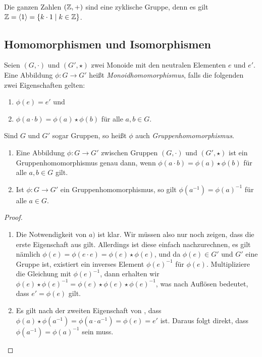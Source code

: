 {\begin{example}
  Die ganzen Zahlen $(\mathbb{Z},+)$ sind eine zyklische Gruppe, denn es gilt $\ZZ = \ip{1} = \left\{k \cdot 1 \suchthat k \in \ZZ \right\}$.
\end{example}

\subsection{Homomorphismen und Isomorphismen}

\begin{definition}[Homomorphismus]\label{def:algebra:homomorphismus}
  Seien $(G,\cdot)$ und $(G',\star)$ zwei Monoide mit den neutralen Elementen $e$ und $e'$. Eine Abbildung $\phi \colon G \rightarrow G'$ heißt \emph{Monoidhomomorphismus}, falls die folgenden zwei Eigenschaften gelten:
  \begin{enumerate}
    \item $\phi(e) = e'$ und
    \item $\phi(a \cdot b) = \phi(a) \star \phi(b)$ für alle $a,b \in G$.
  \end{enumerate}
  Sind $G$ und $G'$ sogar Gruppen, so heißt $\phi$ auch \emph{Gruppenhomomorphismus}.
\end{definition}

\begin{lemma}
  \leavevmode \vspace{-\baselineskip}
  \begin{enumerate}[label=\alph*)]
    \item Eine Abbildung $\phi \colon G \rightarrow G'$ zwischen Gruppen $(G,\cdot)$ und $(G',\star)$ ist ein Gruppenhomomorphismus genau dann, wenn $\phi(a \cdot b) = \phi(a) \star \phi(b)$ für alle $a,b \in G$ gilt.
    \item Ist $\phi \colon G \rightarrow G'$ ein Gruppenhomomorphismus, so gilt $\phi(a^{-1})=\phi(a)^{-1}$ für alle $a \in G$.
  \end{enumerate}
\end{lemma}

\begin{proof}
  \begin{enumerate}[label=\alph*)]
    \item Die Notwendigkeit von $a)$ ist klar. Wir müssen also nur noch zeigen, dass die erste Eigenschaft aus  gilt. Allerdings ist diese einfach nachzurechnen, es gilt nämlich $\phi(e) = \phi(e \cdot e) = \phi(e) \star \phi(e)$, und da $\phi(e) \in G'$ und $G'$ eine Gruppe ist, existiert ein inverses Element $\phi(e)^{-1}$ für $\phi(e)$.
    Multipliziere die Gleichung mit $\phi(e)^{-1}$, dann erhalten wir $\phi(e) \star \phi(e)^{-1} = \phi(e) \star \phi(e) \star \phi(e)^{-1}$, was nach Auflösen bedeutet, dass $e' = \phi(e)$ gilt.
    \item Es gilt nach der zweiten Eigenschaft von , dass $\phi(a) \star \phi(a^{-1}) = \phi(a \cdot a^{-1}) = \phi(e) = e'$ ist. Daraus folgt direkt, dass $\phi(a^{-1}) = \phi(a)^{-1}$ sein muss.
  \end{enumerate}
\end{proof}

}
